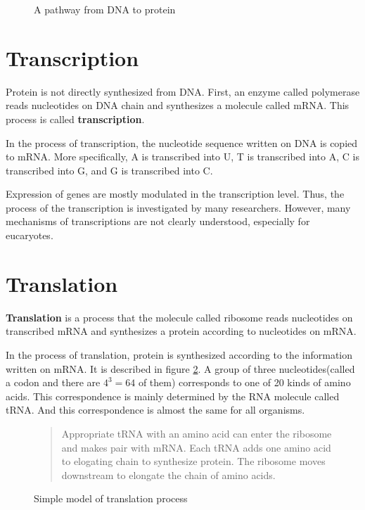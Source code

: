 \begin{figure}
\begin{center}
\end{center}
\caption{A pathway from DNA to protein}
\label{pathpro}
\end{figure}



\section{Transcription}

Protein is not directly synthesized from DNA.  First, an enzyme called
polymerase reads nucleotides on DNA chain and synthesizes a molecule
called mRNA. This process is called {\bf transcription}.

In the process of transcription, the nucleotide sequence written on DNA
is copied to mRNA. More specifically, A is transcribed into U, T is
transcribed into A, C is transcribed into G, and G is transcribed into
C.

Expression of genes are mostly modulated in the transcription level.
Thus, the process of the transcription is investigated by many
researchers. However, many mechanisms of transcriptions are not clearly
understood, especially for eucaryotes.


\section{Translation}
\label{intr_trans}

{\bf Translation} is a process that the molecule called ribosome reads
nucleotides on transcribed mRNA and synthesizes a protein according to
nucleotides on mRNA.

In the process of translation, protein is synthesized according to the
information written on mRNA. It is described in figure \ref{trans1}.  A
group of three nucleotides(called a codon and there are \(4^{3}=64\) of
them) corresponds to one of 20 kinds of amino acids. This correspondence
is mainly determined by the RNA molecule called tRNA. And this
correspondence is almost the same for all organisms. 

\begin{figure}
\begin{center}
\end{center}
\caption{Simple model of translation process}
\label{trans1}

\begin{quotation}
\begin{small}
Appropriate tRNA with an amino acid can enter the ribosome and makes
pair with mRNA. Each tRNA adds one amino acid to elogating chain to
synthesize protein. The ribosome moves downstream to elongate the chain
of amino acids.
\end{small}
\end{quotation}

\end{figure}



